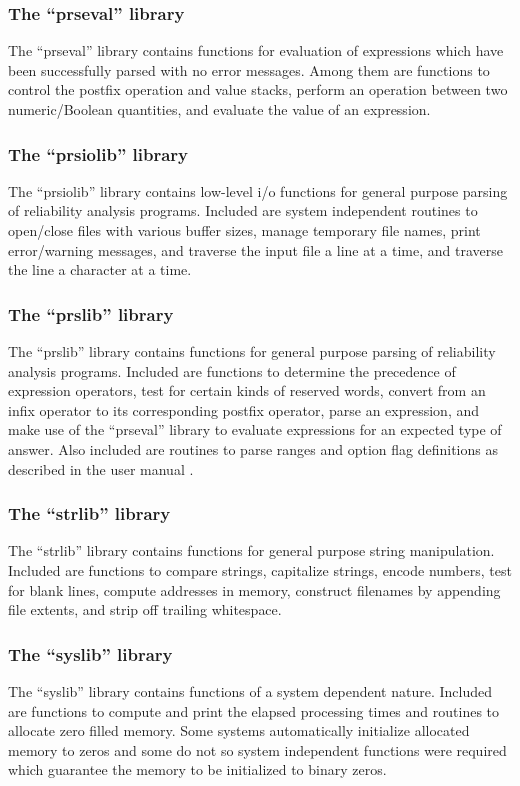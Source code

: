 \subsubsection{The ``prseval'' library}
\label{sec:prseval}
The ``prseval'' library contains functions for evaluation of expressions
which have been successfully parsed with no error messages.  Among them
are functions to control the postfix operation and value stacks, perform
an operation between two numeric/Boolean quantities, and evaluate the
value of an expression.

\subsubsection{The ``prsiolib'' library}
\label{sec:prsiolib}
The ``prsiolib'' library contains low-level i/o functions for general
purpose parsing of reliability analysis programs.
Included are system independent routines to open/close files with
various buffer sizes,
manage temporary file names,
print error/warning messages, and
traverse the
input file a line at a time, and traverse the line
a character at a time.

\subsubsection{The ``prslib'' library}
\label{sec:prslib}
The ``prslib'' library contains functions for general purpose parsing of
reliability analysis programs.
Included are functions to determine the
precedence of expression operators,
test for certain kinds of reserved words,
convert from an infix operator to its
corresponding postfix operator, parse an expression,
and make use of the
``prseval'' library to evaluate expressions for an expected type of answer.
Also included are routines to parse ranges and option flag definitions
as described in the  user manual \cite{assist7man}.

\subsubsection{The ``strlib'' library}
\label{sec:strlib}
The ``strlib'' library contains functions for general purpose string
manipulation.   Included are functions to compare strings,
capitalize strings, encode numbers, test for blank lines, compute
addresses in memory, construct filenames by appending file extents,
and strip off trailing whitespace.

\subsubsection{The ``syslib'' library}
\label{sec:syslib}
The ``syslib'' library contains functions of a system dependent nature.
Included are functions to compute and print the elapsed processing times
and routines to allocate zero filled memory.   Some systems automatically
initialize allocated memory to zeros and some
do not so system independent functions
were required which guarantee the memory to be initialized to binary zeros.

